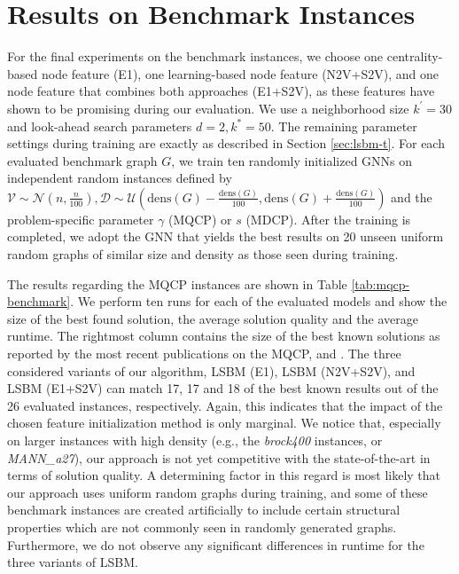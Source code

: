 \documentclass[draft,final]{vutinfth} %
\begin{document}
\section{Results on Benchmark Instances}\label{sec:benchmark-results}
For the final experiments on the benchmark instances, we choose one centrality-based node feature (E1), one learning-based node feature (N2V+S2V), and one node feature that combines both approaches (E1+S2V), as these features have shown to be promising during our evaluation. We use a neighborhood size $k^\prime=30$ and look-ahead search parameters $d=2, k^* = 50$. The remaining parameter settings during training are exactly as described in Section \ref{sec:lsbm-t}. 
For each evaluated benchmark graph $G$, we train ten randomly initialized GNNs on independent random instances defined by $\mathcal{V} \sim \mathcal{N}(n, \frac{n}{100}), \mathcal{D} \sim \mathcal{U}(\mathrm{dens}(G) - \frac{\mathrm{dens}(G)}{100}, \mathrm{dens}(G) + \frac{\mathrm{dens}(G)}{100})$ and the problem-specific parameter $\gamma$ (MQCP) or $s$ (MDCP). 
After the training is completed, we adopt the GNN that yields the best results on 20 unseen uniform random graphs of similar size and density as those seen during training. 

The results regarding the MQCP instances are shown in Table \ref{tab:mqcp-benchmark}. We perform ten runs for each of the evaluated models and show the size of the best found solution, the average solution quality and the average runtime. The rightmost column contains the size of the best known solutions as reported by the most recent publications on the MQCP, \cite{chen_nuqclq_2021} and \cite{peng_solving_2021}. 
The three considered variants of our algorithm, LSBM (E1), LSBM (N2V+S2V), and LSBM (E1+S2V) can match 17, 17 and 18 of the best known results out of the 26 evaluated instances, respectively. Again, this indicates that the impact of the chosen feature initialization method is only marginal. We notice that, especially on larger instances with high density (e.g., the \emph{brock400} instances, or \emph{MANN\_a27}), our approach is not yet competitive with the state-of-the-art in terms of solution quality. A determining factor in this regard is most likely that our approach uses uniform random graphs during training, and some of these benchmark instances are created artificially to include certain structural properties which are not commonly seen in randomly generated graphs. 
Furthermore, we do not observe any significant differences in runtime for the three variants of LSBM. 
\end{document}
